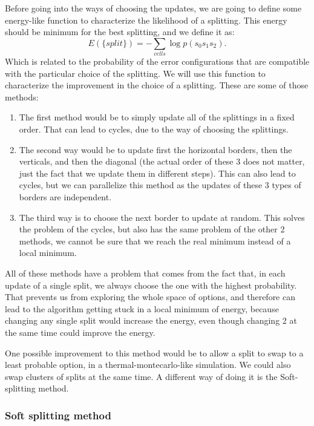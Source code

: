 \documentclass[a4paper,12pt]{article}
\begin{document}
Before going into the ways of choosing the updates, we are going to define some energy-like function to characterize the likelihood of a splitting. This energy should be minimum for the best splitting, and we define it as:
\begin{equation}
E(\{ split\})=-\sum_{cells} \log p(s_0s_1s_2).
\label{energyofsplitting} 
\end{equation}
Which is related to the probability of the error configurations that are compatible with the particular choice of the splitting. We will use this function to characterize the improvement in the choice of a splitting. These are some of those methods:

\begin{enumerate}
\item The first method would be to simply update all of the splittings in a fixed order. That can lead to cycles, due to the way of choosing the splittings.
\item The second way would be to update first the horizontal borders, then the verticals, and then the diagonal (the actual order of these 3 does not matter, just the fact that we update them in different steps). This can also lead to cycles, but we can parallelize this method as the updates of these 3 types of borders are independent.

\item The third way is to choose the next border to update at random. This solves the problem of the cycles, but also has the same problem of the other 2 methods, we cannot be sure that we reach the real minimum instead of a local minimum.
\end{enumerate}

All of these methods have a problem that comes from the fact that, in each update of a single split, we always choose the one with the highest probability. That prevents us from exploring the whole space of options, and therefore can lead to the algorithm getting stuck in a local minimum of energy, because changing any single split would increase the energy, even though changing 2 at the same time could improve the energy. 

One possible improvement to this method would be to allow a split to swap to a least probable option, in a thermal-montecarlo-like simulation. We could also swap clusters of splits at the same time. A different way of doing it is the Soft-splitting method.

\subsubsection{Soft splitting method}
\end{document}
